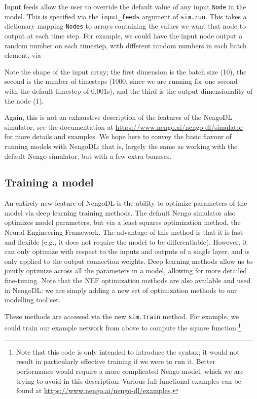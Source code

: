 \documentclass{article}
\begin{document}
Input feeds allow the user to override the default value of any input \texttt{Node} in the model.  This is specified via the \texttt{input\_feeds} argument of \texttt{sim.run}.  This takes a dictionary mapping \texttt{Nodes} to arrays containing the values we want that node to output at each time step.  For example, we could have the input node output a random number on each timestep, with different random numbers in each batch element, via



Note the shape of the input array; the first dimension is the batch size (10), the second is the number of timesteps (1000, since we are running for one second with the default timestep of 0.001s), and the third is the output dimensionality of the node (1).

Again, this is not an exhaustive description of the features of the NengoDL simulator, see the documentation at \url{https://www.nengo.ai/nengo-dl/simulator} for more details and examples.  We hope here to convey the basic flavour of running models with NengoDL; that is, largely the same as working with the default Nengo simulator, but with a few extra bonuses.

\subsection{Training a model}

An entirely new feature of NengoDL is the ability to optimize parameters of the model via deep learning training methods.  The default Nengo simulator also optimizes model parameters, but via a least squares optimization method, the Neural Engineering Framework\citep[NEF;][]{Eliasmith2003}.  The advantage of this method is that it is fast and flexible (e.g., it does not require the model to be differentiable).  However, it can only optimize with respect to the inputs and outputs of a single layer, and is only applied to the output connection weights.  Deep learning methods allow us to jointly optimize across all the parameters in a model, allowing for more detailed fine-tuning.  Note that the NEF optimization methods are also available and used in NengoDL; we are simply adding a new set of optimization methods to our modelling tool set.

These methods are accessed via the new \texttt{sim.train} method.  For example, we could train our example network from above to compute the square function:\footnote{Note that this code is only intended to introduce the syntax; it would not result in particularly effective training if we were to run it.  Better performance would require a more complicated Nengo model, which we are trying to avoid in this description.  Various full functional examples can be found at \url{https://www.nengo.ai/nengo-dl/examples}.}
\end{document}
